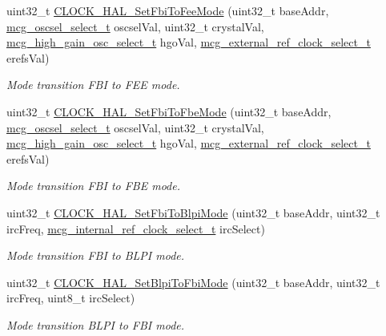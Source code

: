 \begin{DoxyCompactItemize}
uint32\+\_\+t \hyperlink{group__mcg__hal_gaa2fa41449ce63f4d04a7390c93b30ac0}{C\+L\+O\+C\+K\+\_\+\+H\+A\+L\+\_\+\+Set\+Fbi\+To\+Fee\+Mode} (uint32\+\_\+t base\+Addr, \hyperlink{group__mcg__hal_ga199389ca614bebd5d3a6a32b1d5c558c}{mcg\+\_\+oscsel\+\_\+select\+\_\+t} oscsel\+Val, uint32\+\_\+t crystal\+Val, \hyperlink{group__mcg__hal_ga7218a02fa6a0189cb9b1e4e521bd682b}{mcg\+\_\+high\+\_\+gain\+\_\+osc\+\_\+select\+\_\+t} hgo\+Val, \hyperlink{group__mcg__hal_ga9644a6c2e01b6262770ade769051224d}{mcg\+\_\+external\+\_\+ref\+\_\+clock\+\_\+select\+\_\+t} erefs\+Val)
\begin{DoxyCompactList}\small\item\em Mode transition F\+BI to F\+EE mode. \end{DoxyCompactList}\item 
uint32\+\_\+t \hyperlink{group__mcg__hal_ga792831440fe87a8bc3c2b6eb0d882ea9}{C\+L\+O\+C\+K\+\_\+\+H\+A\+L\+\_\+\+Set\+Fbi\+To\+Fbe\+Mode} (uint32\+\_\+t base\+Addr, \hyperlink{group__mcg__hal_ga199389ca614bebd5d3a6a32b1d5c558c}{mcg\+\_\+oscsel\+\_\+select\+\_\+t} oscsel\+Val, uint32\+\_\+t crystal\+Val, \hyperlink{group__mcg__hal_ga7218a02fa6a0189cb9b1e4e521bd682b}{mcg\+\_\+high\+\_\+gain\+\_\+osc\+\_\+select\+\_\+t} hgo\+Val, \hyperlink{group__mcg__hal_ga9644a6c2e01b6262770ade769051224d}{mcg\+\_\+external\+\_\+ref\+\_\+clock\+\_\+select\+\_\+t} erefs\+Val)
\begin{DoxyCompactList}\small\item\em Mode transition F\+BI to F\+BE mode. \end{DoxyCompactList}\item 
uint32\+\_\+t \hyperlink{group__mcg__hal_ga931ce0f902e6d2248a8e0934965ad7d5}{C\+L\+O\+C\+K\+\_\+\+H\+A\+L\+\_\+\+Set\+Fbi\+To\+Blpi\+Mode} (uint32\+\_\+t base\+Addr, uint32\+\_\+t irc\+Freq, \hyperlink{group__mcg__hal_ga9738d5cb312dacd7c75d2ed599ad48c7}{mcg\+\_\+internal\+\_\+ref\+\_\+clock\+\_\+select\+\_\+t} irc\+Select)
\begin{DoxyCompactList}\small\item\em Mode transition F\+BI to B\+L\+PI mode. \end{DoxyCompactList}\item 
uint32\+\_\+t \hyperlink{group__mcg__hal_gaa613b2d7462953f2a277f6d43c8763e7}{C\+L\+O\+C\+K\+\_\+\+H\+A\+L\+\_\+\+Set\+Blpi\+To\+Fbi\+Mode} (uint32\+\_\+t base\+Addr, uint32\+\_\+t irc\+Freq, uint8\+\_\+t irc\+Select)
\begin{DoxyCompactList}\small\item\em Mode transition B\+L\+PI to F\+BI mode. \end{DoxyCompactList}\item 

\end{DoxyCompactItemize}
